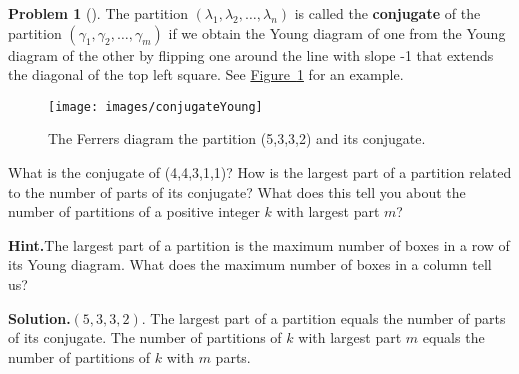 \documentclass[10pt,]{book}
\newcommand{\terminology}[1]{\textbf{#1}}
\theoremstyle{plain}
\theoremstyle{definition}
\newtheorem{activity}[project]{Problem}
\theoremstyle{definition}
\numberwithin{equation}{chapter}
\begin{document}
\begin{activity}[]\label{activity-164}
The partition \((\lambda_1,\lambda_2,\ldots, \lambda_n)\) is called the \terminology{conjugate} of the partition \((\gamma_1,\gamma_2,\ldots, \gamma_m)\) if we obtain the Young diagram of one from the Young diagram of the other by flipping one around the line with slope -1 that extends the diagonal of the top left square. See \hyperref[conjugateYoung]{Figure~\ref{conjugateYoung}} for an example.%
\begin{figure}
\centering
\texttt{[image: images/conjugateYoung]}
\caption{The Ferrers diagram the partition (5,3,3,2) and its conjugate.\label{conjugateYoung}}
\end{figure}
What is the conjugate of (4,4,3,1,1)? How is the largest part of a partition related to the number of parts of its conjugate? What does this tell you about the number of partitions of a positive integer \(k\) with largest part \(m\)?%
\par\medskip\noindent%
\textbf{Hint.}\quad The largest part of a partition is the maximum number of boxes in a row of its Young diagram. What does the maximum number of boxes in a column tell us?%
\par\medskip\noindent%
\textbf{Solution.}\quad \((5,3,3,2)\). The largest part of a partition equals the number of parts of its conjugate. The number of partitions of \(k\) with largest part \(m\) equals the number of partitions of \(k\) with \(m\) parts.%
\end{activity}
\end{document}
